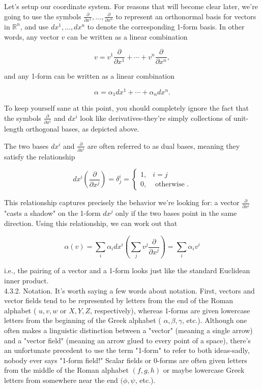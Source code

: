 \documentclass[10pt]{article}
\begin{document}
Let's setup our coordinate system. For reasons that will become clear later, we're going to use the symbols $\frac{\partial}{\partial x^{1}}, \ldots, \frac{\partial}{\partial x^{n}}$ to represent an orthonormal basis for vectors in $\mathbb{R}^{n}$, and use $d x^{1}, \ldots, d x^{n}$ to denote the corresponding 1-form basis. In other words, any vector $v$ can be written as a linear combination

$$
v=v^{1} \frac{\partial}{\partial x^{1}}+\cdots+v^{n} \frac{\partial}{\partial x^{n}},
$$

and any 1-form can be written as a linear combination

$$
\alpha=\alpha_{1} d x^{1}+\cdots+\alpha_{n} d x^{n} .
$$

To keep yourself sane at this point, you should completely ignore the fact that the symbols $\frac{\partial}{\partial x^{i}}$ and $d x^{i}$ look like derivatives-they're simply collections of unit-length orthogonal bases, as depicted above.

The two bases $d x^{i}$ and $\frac{\partial}{\partial x^{i}}$ are often referred to as dual bases, meaning they satisfy the relationship

$$
d x^{i}\left(\frac{\partial}{\partial x^{j}}\right)=\delta_{j}^{i}= \begin{cases}1, & i=j \\ 0, & \text { otherwise } .\end{cases}
$$

This relationship captures precisely the behavior we're looking for: a vector $\frac{\partial}{\partial x^{i}}$ "casts a shadow" on the 1-form $d x^{j}$ only if the two bases point in the same direction. Using this relationship, we can work out that

$$
\alpha(v)=\sum_{i} \alpha_{i} d x^{i}\left(\sum_{j} v^{j} \frac{\partial}{\partial x^{j}}\right)=\sum_{i} \alpha_{i} v^{i}
$$

i.e., the pairing of a vector and a 1-form looks just like the standard Euclidean inner product.\\
4.3.2. Notation. It's worth saying a few words about notation. First, vectors and vector fields tend to be represented by letters from the end of the Roman alphabet ( $u, v, w$ or $X, Y, Z$, respectively), whereas 1-forms are given lowercase letters from the beginning of the Greek alphabet ( $\alpha, \beta, \gamma$, etc.). Although one often makes a linguistic distinction between a "vector" (meaning a single arrow) and a "vector field" (meaning an arrow glued to every point of a space), there's an unfortunate precedent to use the term "1-form" to refer to both ideas-sadly, nobody ever says "1-form field!" Scalar fields or 0-forms are often given letters from the middle of the Roman alphabet $(f, g, h)$ or maybe lowercase Greek letters from somewhere near the end $(\phi, \psi$, etc.).
\end{document}
